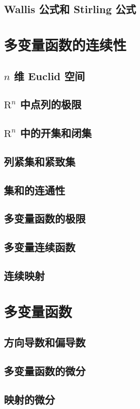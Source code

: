 \documentclass[a4paper, 11pt]{ctexbook}
\begin{document}
        \section{Wallis 公式和 Stirling 公式}
    \chapter{多变量函数的连续性}
        \section{$n$ 维 Euclid 空间}
            
        \section{$\mathrm{R}^n$ 中点列的极限}
        \section{$\mathrm{R}^n$ 中的开集和闭集}
        \section{列紧集和紧致集}
        \section{集和的连通性}
        \section{多变量函数的极限}
        \section{多变量连续函数}
        \section{连续映射}
    \chapter{多变量函数}
        \section{方向导数和偏导数}
        \section{多变量函数的微分}
        \section{映射的微分}
\end{document}

